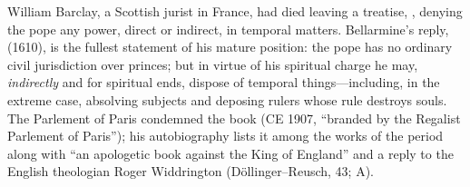 William Barclay, a Scottish jurist in France, had died leaving a
treatise, , denying the pope any power,
direct or indirect, in temporal matters. Bellarmine's reply,
 (1610), is the fullest
statement of his mature position: the pope has no ordinary civil
jurisdiction over princes; but in virtue of his spiritual charge
he may, \emph{indirectly} and for spiritual ends, dispose of
temporal things---including, in the extreme case, absolving
subjects and deposing rulers whose rule destroys souls. The
Parlement of Paris condemned the book (CE 1907, ``branded by the
Regalist Parlement of Paris''); his autobiography lists it among
the works of the period along with ``an apologetic book against
the King of England'' and a reply to the English theologian Roger
Widdrington (D\"ollinger--Reusch, 43; A).


